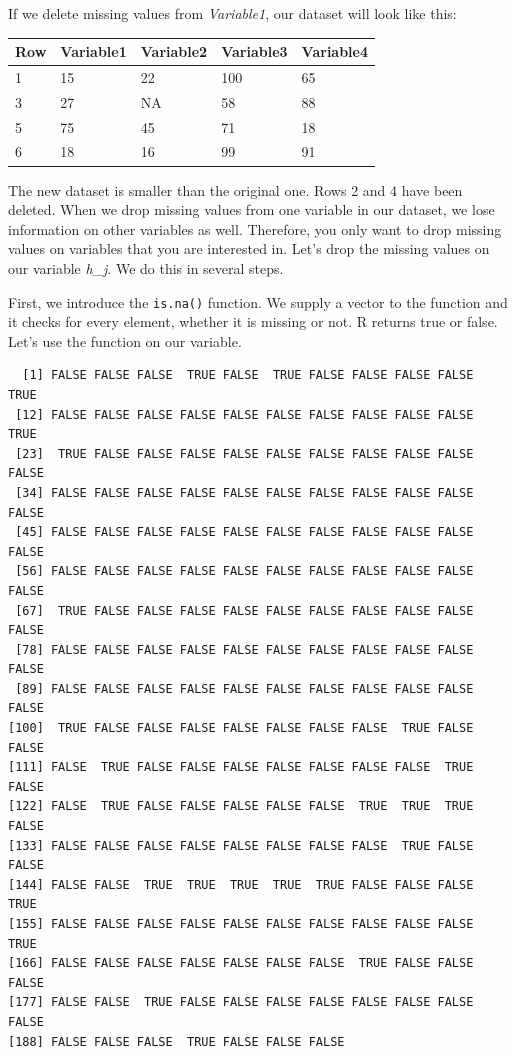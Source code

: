 \documentclass[]{book}
\newenvironment{Shaded}{\begin{snugshade}}{\end{snugshade}}
\newcommand{\KeywordTok}[1]{\textcolor[rgb]{0.13,0.29,0.53}{\textbf{#1}}}
\newcommand{\OperatorTok}[1]{\textcolor[rgb]{0.81,0.36,0.00}{\textbf{#1}}}
\newcommand{\NormalTok}[1]{#1}
\theoremstyle{definition}
\theoremstyle{definition}
\theoremstyle{definition}
\theoremstyle{remark}
\begin{document}
If we delete missing values from \emph{Variable1}, our dataset will look
like this:

\begin{tabular}{l|l|l|l|l}
\hline
Row & Variable1 & Variable2 & Variable3 & Variable4\\
\hline
1 & 15 & 22 & 100 & 65\\
\hline
3 & 27 & NA & 58 & 88\\
\hline
5 & 75 & 45 & 71 & 18\\
\hline
6 & 18 & 16 & 99 & 91\\
\hline
\end{tabular}

The new dataset is smaller than the original one. Rows 2 and 4 have been
deleted. When we drop missing values from one variable in our dataset,
we lose information on other variables as well. Therefore, you only want
to drop missing values on variables that you are interested in. Let's
drop the missing values on our variable \emph{h\_j}. We do this in
several steps.

First, we introduce the \texttt{is.na()} function. We supply a vector to
the function and it checks for every element, whether it is missing or
not. R returns true or false. Let's use the function on our variable.

\begin{Shaded}
\end{Shaded}

\begin{verbatim}
  [1] FALSE FALSE FALSE  TRUE FALSE  TRUE FALSE FALSE FALSE FALSE  TRUE
 [12] FALSE FALSE FALSE FALSE FALSE FALSE FALSE FALSE FALSE FALSE  TRUE
 [23]  TRUE FALSE FALSE FALSE FALSE FALSE FALSE FALSE FALSE FALSE FALSE
 [34] FALSE FALSE FALSE FALSE FALSE FALSE FALSE FALSE FALSE FALSE FALSE
 [45] FALSE FALSE FALSE FALSE FALSE FALSE FALSE FALSE FALSE FALSE FALSE
 [56] FALSE FALSE FALSE FALSE FALSE FALSE FALSE FALSE FALSE FALSE FALSE
 [67]  TRUE FALSE FALSE FALSE FALSE FALSE FALSE FALSE FALSE FALSE FALSE
 [78] FALSE FALSE FALSE FALSE FALSE FALSE FALSE FALSE FALSE FALSE FALSE
 [89] FALSE FALSE FALSE FALSE FALSE FALSE FALSE FALSE FALSE FALSE FALSE
[100]  TRUE FALSE FALSE FALSE FALSE FALSE FALSE FALSE  TRUE FALSE FALSE
[111] FALSE  TRUE FALSE FALSE FALSE FALSE FALSE FALSE FALSE  TRUE FALSE
[122] FALSE  TRUE FALSE FALSE FALSE FALSE FALSE  TRUE  TRUE  TRUE FALSE
[133] FALSE FALSE FALSE FALSE FALSE FALSE FALSE FALSE  TRUE FALSE FALSE
[144] FALSE FALSE  TRUE  TRUE  TRUE  TRUE  TRUE FALSE FALSE FALSE  TRUE
[155] FALSE FALSE FALSE FALSE FALSE FALSE FALSE FALSE FALSE FALSE  TRUE
[166] FALSE FALSE FALSE FALSE FALSE FALSE FALSE  TRUE FALSE FALSE FALSE
[177] FALSE FALSE  TRUE FALSE FALSE FALSE FALSE FALSE FALSE FALSE FALSE
[188] FALSE FALSE FALSE  TRUE FALSE FALSE FALSE
\end{verbatim}
\end{document}
